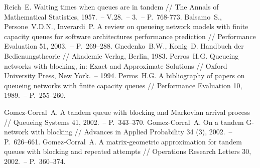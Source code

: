\documentclass[a4paper,12pt,russian]{extarticle}
\newcommand{\No}{\textnumero}
\begin{document}
\begin{thebibliography}{99}
 Reich~E.  Waiting times when queues are in tandem // The Annals of Mathematical Statistics, 1957.~-- V.28.~-- \No{}3.~-- P.~768-773.
 Balsamo~S., Persone~V.D.N., Inverardi~P. A review on queueing network models with finite capacity queues for software architectures performance prediction // Performance Evaluation 51, 2003.~-- P.~269–288.
 Gnedenko~B.W., Konig~D. Handbuch der Bedienungstheorie // Akademie Verlag, Berlin, 1983.
 Perros~H.G.  Queueing networks with blocking, in: Exact and Approximate Solutions // Oxford University Press, New York.~-- 1994. 
 Perros~H.G. A bibliography of papers on queueing networks with finite capacity queues // Performance Evaluation 10, 1989.~-- P.~255–260.


 Gomez-Corral~A. A tandem queue with blocking and Markovian arrival process // Queueing Systems 41, 2002.~-- P.~343–370. 
 Gomez-Corral~A. On a tandem G-network with blocking // Advances in Applied Probability 34 (3), 2002.~-- P.~626–661.
 Gomez-Corral~A. A matrix-geometric approximation for tandem queues with blocking and repeated attempts // Operations Research Letters  30, 2002.~-- P.~360–374.


\end{thebibliography}
\end{document}
